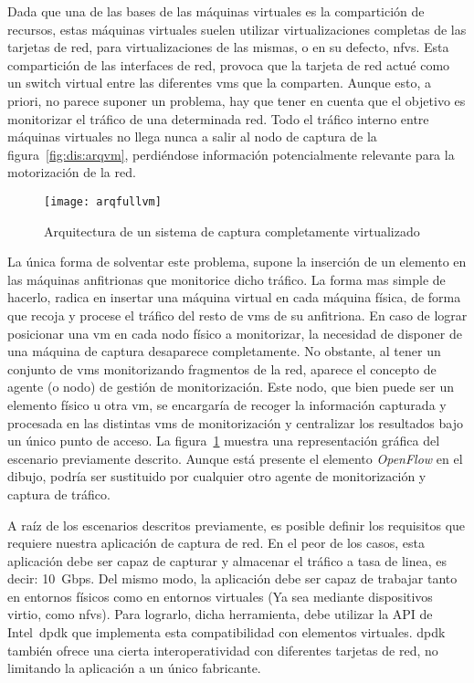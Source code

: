 Dada que una de las bases de las máquinas virtuales es la compartición de recursos, estas máquinas virtuales suelen utilizar virtualizaciones completas de las tarjetas de red, para virtualizaciones de las mismas, o en su defecto, \glspl{nfv}. Esta compartición de las interfaces de red, provoca que la tarjeta de red actué como un switch virtual entre las diferentes \glspl{vm} que la comparten. Aunque esto, a priori, no parece suponer un problema, hay que tener en cuenta que el objetivo es monitorizar el tráfico de una determinada red. Todo el tráfico interno entre máquinas virtuales no llega nunca a salir al nodo de captura de la figura~\ref{fig:dis:arqvm}, perdiéndose información potencialmente relevante para la motorización de la red.


\begin{figure}[!th]
\centering
\texttt{[image: arqfullvm]}
\caption{Arquitectura de un sistema de captura completamente virtualizado}
\label{fig:dis:arqfullvm}
\end{figure}

La única forma de solventar este problema, supone la inserción de un elemento en las máquinas anfitrionas que monitorice dicho tráfico. La forma mas simple de hacerlo, radica en insertar una máquina virtual en cada máquina física, de forma que recoja y procese el tráfico del resto de \glspl{vm} de su anfitriona.
En caso de lograr posicionar una \gls{vm} en cada nodo físico a monitorizar, la necesidad de disponer de una máquina de captura desaparece completamente. No obstante, al tener un conjunto de \glspl{vm} monitorizando fragmentos de la red, aparece el concepto de agente (o nodo) de gestión de monitorización. Este nodo, que bien puede ser un elemento físico u otra \gls{vm}, se encargaría de recoger la información capturada y procesada en las distintas \glspl{vm} de monitorización y centralizar los resultados bajo un único punto de acceso. La figura~\ref{fig:dis:arqfullvm} muestra una representación gráfica del escenario previamente descrito. Aunque está presente el elemento \textit{OpenFlow} en el dibujo, podría ser sustituido por cualquier otro agente de monitorización y captura de tráfico.


A raíz de los escenarios descritos previamente, es posible definir los requisitos que requiere nuestra aplicación de captura de red.
En el peor de los casos, esta aplicación debe ser capaz de capturar y almacenar el tráfico a tasa de linea, es decir: 10~Gbps.
Del mismo modo, la aplicación debe ser capaz de trabajar tanto en entornos físicos como en entornos virtuales (Ya sea mediante dispositivos \gls{virtio}, como \glspl{nfv}).
Para lograrlo, dicha herramienta, debe utilizar la API de Intel~\gls{dpdk} que implementa esta compatibilidad con elementos virtuales. \gls{dpdk} también ofrece una cierta interoperatividad con diferentes tarjetas de red, no limitando la aplicación a un único fabricante.

